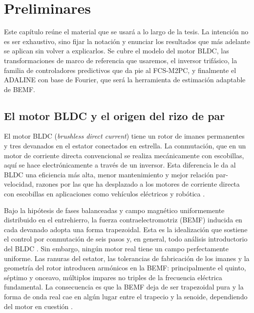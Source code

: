 \documentclass[../../../Tesis_JALS_Maestria.tex]{subfiles}
\begin{document}
\chapter{Preliminares}
\label{cap:preliminares}

Este capítulo reúne el material que se usará a lo largo de la tesis. La intención no es ser exhaustivo, sino fijar la notación y enunciar los resultados que más adelante se aplican sin volver a explicarlos. Se cubre el modelo del motor BLDC, las transformaciones de marco de referencia que usaremos, el inversor trifásico, la familia de controladores predictivos que da pie al FCS-M2PC, y finalmente el ADALINE con base de Fourier, que será la herramienta de estimación adaptable de BEMF.

\section{El motor BLDC y el origen del rizo de par}
\label{sec:bldc-rizo}

El motor BLDC (\textit{brushless direct current}) tiene un rotor de imanes permanentes y tres devanados en el estator conectados en estrella. La conmutación, que en un motor de corriente directa convencional se realiza mecánicamente con escobillas, aquí se hace electrónicamente a través de un inversor. Esta diferencia le da al BLDC una eficiencia más alta, menor mantenimiento y mejor relación par-velocidad, razones por las que ha desplazado a los motores de corriente directa con escobillas en aplicaciones como vehículos eléctricos y robótica \citep{coronado2025, krishnan2009pmbldc}.

Bajo la hipótesis de fases balanceadas y campo magnético uniformemente distribuido en el entrehierro, la fuerza contraelectromotriz (BEMF) inducida en cada devanado adopta una forma trapezoidal. Esta es la idealización que sostiene el control por conmutación de seis pasos y, en general, todo análisis introductorio del BLDC \citep{krause2013analysis}. Sin embargo, ningún motor real tiene un campo perfectamente uniforme. Las ranuras del estator, las tolerancias de fabricación de los imanes y la geometría del rotor introducen armónicos en la BEMF: principalmente el quinto, séptimo y onceavo, múltiplos impares no triples de la frecuencia eléctrica fundamental. La consecuencia es que la BEMF deja de ser trapezoidal pura y la forma de onda real cae en algún lugar entre el trapecio y la senoide, dependiendo del motor en cuestión \citep{shao2003direct}.
\end{document}
